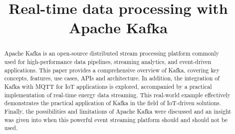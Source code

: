 \documentclass[conference]{IEEEtran}
\begin{document}
\title{Real-time data processing with Apache Kafka}

\author{
}

\maketitle

\begin{abstract}
Apache Kafka is an open-source distributed stream processing platform commonly used for high-performance data pipelines, streaming analytics, and event-driven applications. This paper provides a comprehensive overview of Kafka, covering key concepts, features, use cases, APIs and architecture. In addition, the integration of Kafka with MQTT for IoT applications is explored, accompanied by a practical implementation of real-time energy data streaming. This real-world example effectively demonstrates the practical application of Kafka in the field of IoT-driven solutions. Finally, the possibilities and limitations of Apache Kafka were discussed and an insight was given into when this powerful event streaming platform should and should not be used.

\end{abstract}












\graphicspath{{images/}}


\end{document}
